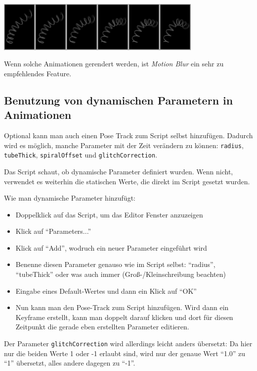 \documentclass[12pt,a4paper]{scrartcl}
\begin{document}
\begin{center}
	\includegraphics[width=0.75\textwidth]{../pics/helixAni.jpg}
\end{center}

Wenn solche Animationen gerendert werden, ist \emph{Motion Blur} ein sehr zu
empfehlendes Feature.

\subsection{Benutzung von dynamischen Parametern in Animationen}
Optional kann man auch einen Pose Track zum Script selbst hinzufügen. Dadurch
wird es möglich, manche Parameter mit der Zeit verändern zu können:
\texttt{radius}, \texttt{tubeThick}, \texttt{spiralOffset}
und \texttt{glitchCorrection}.

Das Script schaut, ob dynamische Parameter definiert wurden. Wenn nicht,
verwendet es weiterhin die statischen Werte, die direkt im Script gesetzt
wurden.

Wie man dynamische Parameter hinzufügt:
\begin{itemize}
	\item Doppelklick auf das Script, um das Editor Fenster anzuzeigen
	\item Klick auf ``Parameters...''
	\item Klick auf ``Add'', wodruch ein neuer Parameter eingeführt wird
	\item Benenne diesen Parameter genauso wie im Script selbst: ``radius'',
		``tubeThick'' oder was auch immer (Groß-/Kleinschreibung beachten)
	\item Eingabe eines Default-Wertes und dann ein Klick auf ``OK''
	\item Nun kann man den Pose-Track zum Script hinzufügen. Wird dann ein
		Keyframe erstellt, kann man doppelt darauf klicken und dort für diesen
		Zeitpunkt die gerade eben erstellten Parameter editieren.
\end{itemize}

Der Parameter \texttt{glitchCorrection} wird allerdings leicht anders übersetzt:
Da hier nur die beiden Werte 1 oder -1 erlaubt sind, wird nur der genaue Wert
``1.0'' zu ``1'' übersetzt, alles andere dagegen zu ``-1''.
\end{document}
